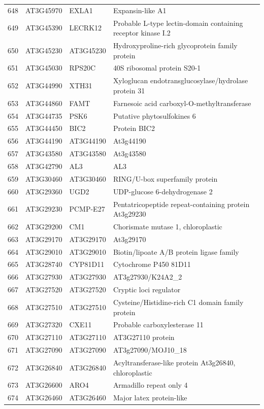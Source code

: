 \documentclass[11pt]{article}
\begin{document}
\begin{center}
\begin{tabular}{rlll}
648 & AT3G45970 & EXLA1 & Expansin-like A1\\
649 & AT3G45390 & LECRK12 & Probable L-type lectin-domain containing receptor kinase I.2\\
650 & AT3G45230 & AT3G45230 & Hydroxyproline-rich glycoprotein family protein\\
651 & AT3G45030 & RPS20C & 40S ribosomal protein S20-1\\
652 & AT3G44990 & XTH31 & Xyloglucan endotransglucosylase/hydrolase protein 31\\
653 & AT3G44860 & FAMT & Farnesoic acid carboxyl-O-methyltransferase\\
654 & AT3G44735 & PSK6 & Putative phytosulfokines 6\\
655 & AT3G44450 & BIC2 & Protein BIC2\\
656 & AT3G44190 & AT3G44190 & At3g44190\\
657 & AT3G43580 & AT3G43580 & At3g43580\\
658 & AT3G42790 & AL3 & AL3\\
659 & AT3G30460 & AT3G30460 & RING/U-box superfamily protein\\
660 & AT3G29360 & UGD2 & UDP-glucose 6-dehydrogenase 2\\
661 & AT3G29230 & PCMP-E27 & Pentatricopeptide repeat-containing protein At3g29230\\
662 & AT3G29200 & CM1 & Chorismate mutase 1, chloroplastic\\
663 & AT3G29170 & AT3G29170 & At3g29170\\
664 & AT3G29010 & AT3G29010 & Biotin/lipoate A/B protein ligase family\\
665 & AT3G28740 & CYP81D11 & Cytochrome P450 81D11\\
666 & AT3G27930 & AT3G27930 & AT3g27930/K24A2\_2\\
667 & AT3G27520 & AT3G27520 & Cryptic loci regulator\\
668 & AT3G27510 & AT3G27510 & Cysteine/Histidine-rich C1 domain family protein\\
669 & AT3G27320 & CXE11 & Probable carboxylesterase 11\\
670 & AT3G27110 & AT3G27110 & AT3G27110 protein\\
671 & AT3G27090 & AT3G27090 & AT3g27090/MOJ10\_18\\
672 & AT3G26840 & AT3G26840 & Acyltransferase-like protein At3g26840, chloroplastic\\
673 & AT3G26600 & ARO4 & Armadillo repeat only 4\\
674 & AT3G26460 & AT3G26460 & Major latex protein-like\\

\end{tabular}
\end{center}
\end{document}
